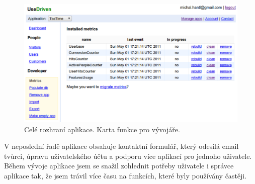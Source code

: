 \documentclass[bc,male,java,dept456]{diploma}						%
\begin{document}
\begin{figure}[h]
	\centering
	\includegraphics[width=14.65cm]{img/developer_functions.pdf}
	\caption{Celé rozhraní aplikace. Karta funkce pro vývojáře.}
	\label{img:developer_features}
\end{figure}

V neposlední řadě aplikace obsahuje kontaktní formulář, který odesílá email tvůrci, úpravu uživatelského účtu a podporu více aplikací pro jednoho uživatele. Během vývoje aplikace jsem se snažil zohlednit potřeby uživatele i správce aplikace tak, že jsem trávil více času na funkcích, které byly používány častěji.

\end{document}
